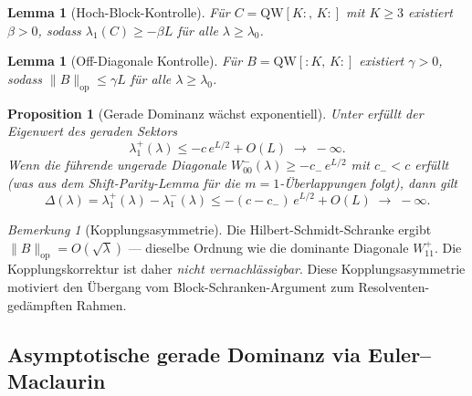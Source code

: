 \documentclass[12pt,a4paper]{article}
\newtheorem{lemma}[theorem]{Lemma}
\newtheorem{proposition}[theorem]{Proposition}
\theoremstyle{definition}
\theoremstyle{remark}
\newtheorem{remark}[theorem]{Bemerkung}
\begin{document}
\begin{lemma}[Hoch-Block-Kontrolle]
\label{lem:L2}
Für $C = \mathrm{QW}[K{:},\,K{:}]$ mit $K \geq 3$ existiert $\beta > 0$, sodass $\lambda_1(C) \geq -\beta L$ für alle $\lambda \geq \lambda_0$.
\end{lemma}

\begin{lemma}[Off-Diagonale Kontrolle]
\label{lem:L3}
Für $B = \mathrm{QW}[{:}K,\,K{:}]$ existiert $\gamma > 0$, sodass $\|B\|_{\mathrm{op}} \leq \gamma L$ für alle $\lambda \geq \lambda_0$.
\end{lemma}

\begin{proposition}[Gerade Dominanz wächst exponentiell]
\label{prop:gap-growth}
Unter  erfüllt der Eigenwert des geraden Sektors
\[
  \lambda_1^+(\lambda) \leq -c\,e^{L/2} + O(L) \;\to\; -\infty.
\]
Wenn die führende ungerade Diagonale $W_{00}^-(\lambda) \geq -c_-\,e^{L/2}$ mit $c_- < c$ erfüllt (was aus dem Shift-Parity-Lemma für die $m=1$-Überlappungen folgt), dann gilt
\[
  \Delta(\lambda) = \lambda_1^+(\lambda) - \lambda_1^-(\lambda) \leq -(c - c_-)\,e^{L/2} + O(L) \;\to\; -\infty.
\]
\end{proposition}

\begin{remark}[Kopplungsasymmetrie]
\label{rem:coupling-revisited}
Die Hilbert-Schmidt-Schranke ergibt $\|B\|_{\mathrm{op}} = O(\sqrt{\lambda})$ --- dieselbe Ordnung wie die dominante Diagonale $W_{11}^+$. Die Kopplungskorrektur ist daher \emph{nicht vernachlässigbar}. Diese Kopplungsasymmetrie motiviert den Übergang vom Block-Schranken-Argument zum Resolventen-gedämpften Rahmen.
\end{remark}

\subsection{Asymptotische gerade Dominanz via Euler--Maclaurin}
\end{document}
